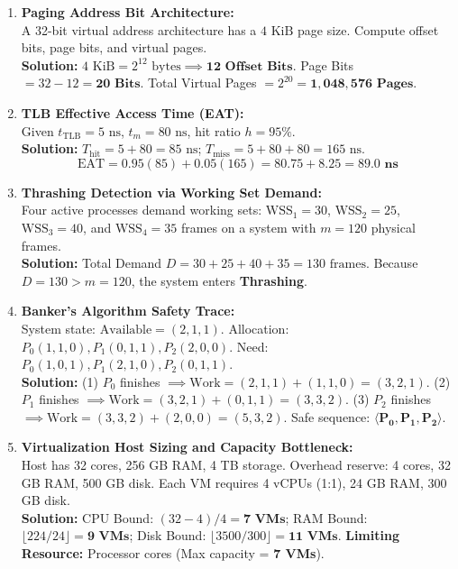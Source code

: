 \begin{enumerate}[label=\textbf{Problem \arabic*.},leftmargin=1.5cm]
\item \textbf{Paging Address Bit Architecture:} \\
A 32-bit virtual address architecture has a $4\text{ KiB}$ page size. Compute offset bits, page bits, and virtual pages. \\
\textbf{Solution:} $4\text{ KiB} = 2^{12}\text{ bytes} \implies \mathbf{12\text{ Offset Bits}}$. Page Bits $= 32 - 12 = \mathbf{20\text{ Bits}}$. Total Virtual Pages $= 2^{20} = \mathbf{1,048,576\text{ Pages}}$.

\item \textbf{TLB Effective Access Time (EAT):} \\
Given $t_{\text{TLB}} = 5\text{ ns}$, $t_m = 80\text{ ns}$, hit ratio $h = 95\%$. \\
\textbf{Solution:} $T_{\text{hit}} = 5 + 80 = 85\text{ ns}$; $T_{\text{miss}} = 5 + 80 + 80 = 165\text{ ns}$.
\[
\text{EAT} = 0.95(85) + 0.05(165) = 80.75 + 8.25 = \mathbf{89.0\text{ ns}}
\]

\item \textbf{Thrashing Detection via Working Set Demand:} \\
Four active processes demand working sets: $\text{WSS}_1 = 30$, $\text{WSS}_2 = 25$, $\text{WSS}_3 = 40$, and $\text{WSS}_4 = 35$ frames on a system with $m = 120$ physical frames. \\
\textbf{Solution:} Total Demand $D = 30 + 25 + 40 + 35 = 130\text{ frames}$. Because $D = 130 > m = 120$, the system enters \textbf{Thrashing}.

\item \textbf{Banker's Algorithm Safety Trace:} \\
System state: $\text{Available} = (2, 1, 1)$. Allocation: $P_0(1,1,0), P_1(0,1,1), P_2(2,0,0)$. Need: $P_0(1,0,1), P_1(2,1,0), P_2(0,1,1)$. \\
\textbf{Solution:} (1) $P_0$ finishes $\implies \text{Work} = (2,1,1) + (1,1,0) = (3,2,1)$. (2) $P_1$ finishes $\implies \text{Work} = (3,2,1) + (0,1,1) = (3,3,2)$. (3) $P_2$ finishes $\implies \text{Work} = (3,3,2) + (2,0,0) = (5,3,2)$. Safe sequence: $\mathbf{\langle P_0, P_1, P_2 \rangle}$.

\item \textbf{Virtualization Host Sizing and Capacity Bottleneck:} \\
Host has 32 cores, 256 GB RAM, 4 TB storage. Overhead reserve: 4 cores, 32 GB RAM, 500 GB disk. Each VM requires 4 vCPUs (1:1), 24 GB RAM, 300 GB disk. \\
\textbf{Solution:} CPU Bound: $(32 - 4) / 4 = \mathbf{7\text{ VMs}}$; RAM Bound: $\lfloor 224 / 24 \rfloor = \mathbf{9\text{ VMs}}$; Disk Bound: $\lfloor 3500 / 300 \rfloor = \mathbf{11\text{ VMs}}$. \textbf{Limiting Resource:} Processor cores (Max capacity = \textbf{7 VMs}).


\end{enumerate}
